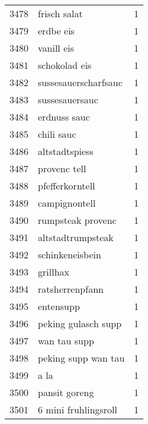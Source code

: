 \begin{tabular}{llr}
3478 &                                       frisch salat &      1 \\
3479 &                                          erdbe eis &      1 \\
3480 &                                         vanill eis &      1 \\
3481 &                                      schokolad eis &      1 \\
3482 &                               sussesauerscharfsauc &      1 \\
3483 &                                     sussesauersauc &      1 \\
3484 &                                       erdnuss sauc &      1 \\
3485 &                                         chili sauc &      1 \\
3486 &                                     altstadtspiess &      1 \\
3487 &                                       provenc tell &      1 \\
3488 &                                    pfefferkorntell &      1 \\
3489 &                                      campignontell &      1 \\
3490 &                                  rumpsteak provenc &      1 \\
3491 &                                  altstadtrumpsteak &      1 \\
3492 &                                    schinkeneisbein &      1 \\
3493 &                                           grillhax &      1 \\
3494 &                                    ratsherrenpfann &      1 \\
3495 &                                          entensupp &      1 \\
3496 &                                peking gulasch supp &      1 \\
3497 &                                       wan tau supp &      1 \\
3498 &                                peking supp wan tau &      1 \\
3499 &                                               a la &      1 \\
3500 &                                      pansit goreng &      1 \\
3501 &                               6 mini fruhlingsroll &      1 \\

\end{tabular}
